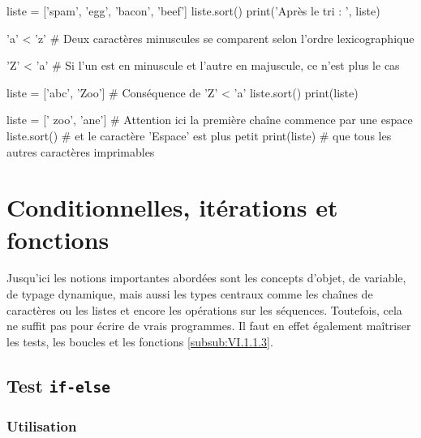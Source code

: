 \begin{idleconsole*}
\begin{pyconsole}
liste = ['spam', 'egg', 'bacon', 'beef']
liste.sort()
print('Après le tri : ', liste)

'a' < 'z' # Deux caractères minuscules se comparent selon l'ordre lexicographique

'Z' < 'a' # Si l'un est en minuscule et l'autre en majuscule, ce n'est plus le cas

liste = ['abc', 'Zoo'] # Conséquence de 'Z' < 'a'
liste.sort()
print(liste)

liste = [' zoo', 'ane'] # Attention ici la première chaîne commence par une espace
liste.sort()            # et le caractère 'Espace' est plus petit
print(liste)            # que tous les autres caractères imprimables

\end{pyconsole}
\end{idleconsole*}



\section[\texorpdfstring{Introduction aux conditionnelles,\newline itérations et fonctions}{Introduction aux conditionnelles, itérations et fonctions}]{Conditionnelles, itérations et fonctions}
\label{sec:XI.3}

Jusqu'ici les notions importantes abordées sont les concepts d'objet, de variable, de typage dynamique, mais aussi les types centraux comme les chaînes de caractères ou les listes et encore les opérations sur les séquences. Toutefois, cela ne suffit pas pour écrire de vrais programmes. Il faut en effet également maîtriser les tests, les boucles et les fonctions  \cref{subsub:VI.1.1.3}.


\subsection[Test {\normalfont\texttt{if-else}}]{Test {\normalfont\texttt{if-else}}}
\label{sub:XI.3.1}

\subsubsection[Utilisation]{Utilisation}
\label{subsub:XI.3.1.1}

